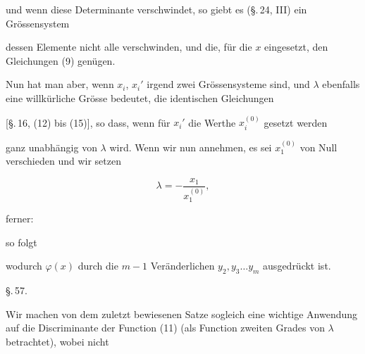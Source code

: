 

und wenn diese Determinante verschwindet, so giebt es (\S.\,24, III) ein Gr\"ossensystem


dessen Elemente nicht alle verschwinden, und die, f\"ur die $x$ eingesetzt, den Gleichungen (9) gen\"ugen.

Nun hat man aber, wenn $x_i$, $x_i'$ irgend zwei Gr\"ossensysteme sind, und $\lambda$ ebenfalls eine willk\"urliche Gr\"osse bedeutet, die identischen Gleichungen


[\S.\,16, (12) bis (15)], so dass, wenn f\"ur $x_i'$ die Werthe $x_i^{(0)}$ gesetzt werden


ganz unabh\"angig von $\lambda$ wird. Wenn wir nun annehmen, es sei $x_1^{(0)}$ von Null verschieden und wir setzen

\[
\lambda = -\frac{x_1}{x_1^{(0)}},
\]

ferner:


so folgt


wodurch $\varphi(x)$ durch die $m - 1$ Ver\"anderlichen $y_2, y_3 \ldots y_m$ ausgedr\"uckt ist.

\begin{center}
\S.\,57.

\end{center}

Wir machen von dem zuletzt bewiesenen Satze sogleich eine wichtige Anwendung auf die Discriminante der Function (11) (als Function zweiten Grades von $\lambda$ betrachtet), wobei nicht
